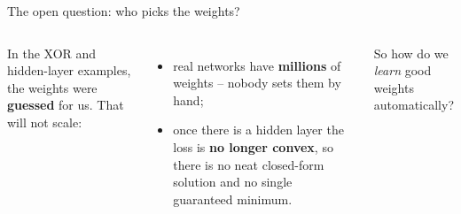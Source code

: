 \documentclass[aspectratio=43]{beamer}
\begin{document}
\begin{frame}{The open question: who picks the weights?}
  \begin{columns}[T]
    In the XOR and hidden-layer examples, the weights were \textbf{guessed} for us. That will
    not scale:
    \begin{itemize}\small
      \item real networks have \textbf{millions} of weights -- nobody sets them by hand;
      \item once there is a hidden layer the loss is \textbf{no longer convex}, so there is no
        neat closed-form solution and no single guaranteed minimum.
    \end{itemize}
    \vskip 4pt
    So how do we \emph{learn} good weights automatically?
  \end{columns}
\end{frame}
\end{document}
